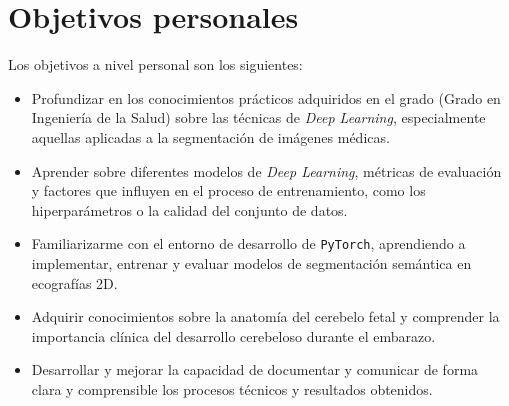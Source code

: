 \section{Objetivos personales}
Los objetivos a nivel personal son los siguientes:
\begin{itemize}
    \item Profundizar en los conocimientos prácticos adquiridos en el grado (Grado en Ingeniería de la Salud) sobre las técnicas de \textit{Deep Learning}, especialmente aquellas aplicadas a la segmentación de imágenes médicas.
    \item Aprender sobre diferentes modelos de \textit{Deep Learning}, métricas de evaluación y factores que influyen en el proceso de entrenamiento, como los hiperparámetros o la calidad del conjunto de datos.
    \item Familiarizarme con el entorno de desarrollo de \texttt{PyTorch}, aprendiendo a implementar, entrenar y evaluar modelos de segmentación semántica en ecografías 2D.
    \item Adquirir conocimientos sobre la anatomía del cerebelo fetal y comprender la importancia clínica del desarrollo cerebeloso durante el embarazo.
    \item Desarrollar y mejorar la capacidad de documentar y comunicar de forma clara y comprensible los procesos técnicos y resultados obtenidos.
\end{itemize}









